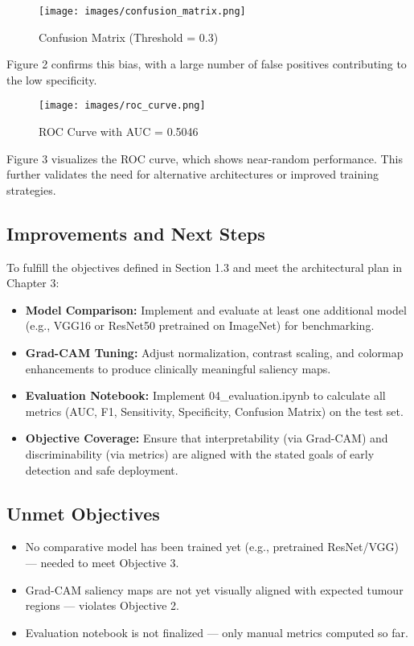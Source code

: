 \documentclass[12pt]{article}
\begin{document}
\begin{figure}[H]
\centering
\texttt{[image: images/confusion\_matrix.png]}
\caption{Confusion Matrix (Threshold = 0.3)}
\end{figure}
Figure 2 confirms this bias, with a large number of false positives contributing to the low specificity.

\begin{figure}[H]
\centering
\texttt{[image: images/roc\_curve.png]}
\caption{ROC Curve with AUC = 0.5046}
\end{figure}
Figure 3 visualizes the ROC curve, which shows near-random performance. This further validates the need for alternative architectures or improved training strategies.

\subsection{Improvements and Next Steps}
To fulfill the objectives defined in Section 1.3 and meet the architectural plan in Chapter 3:
\begin{itemize}
    \item \textbf{Model Comparison:} Implement and evaluate at least one additional model (e.g., VGG16 or ResNet50 pretrained on ImageNet) for benchmarking.
    \item \textbf{Grad-CAM Tuning:} Adjust normalization, contrast scaling, and colormap enhancements to produce clinically meaningful saliency maps.
    \item \textbf{Evaluation Notebook:} Implement 04\_evaluation.ipynb to calculate all metrics (AUC, F1, Sensitivity, Specificity, Confusion Matrix) on the test set.
    \item \textbf{Objective Coverage:} Ensure that interpretability (via Grad-CAM) and discriminability (via metrics) are aligned with the stated goals of early detection and safe deployment.
\end{itemize}

\subsection*{Unmet Objectives}
\begin{itemize}
    \item No comparative model has been trained yet (e.g., pretrained ResNet/VGG) — needed to meet Objective 3.
    \item Grad-CAM saliency maps are not yet visually aligned with expected tumour regions — violates Objective 2.
    \item Evaluation notebook is not finalized — only manual metrics computed so far.
\end{itemize}
\end{document}
